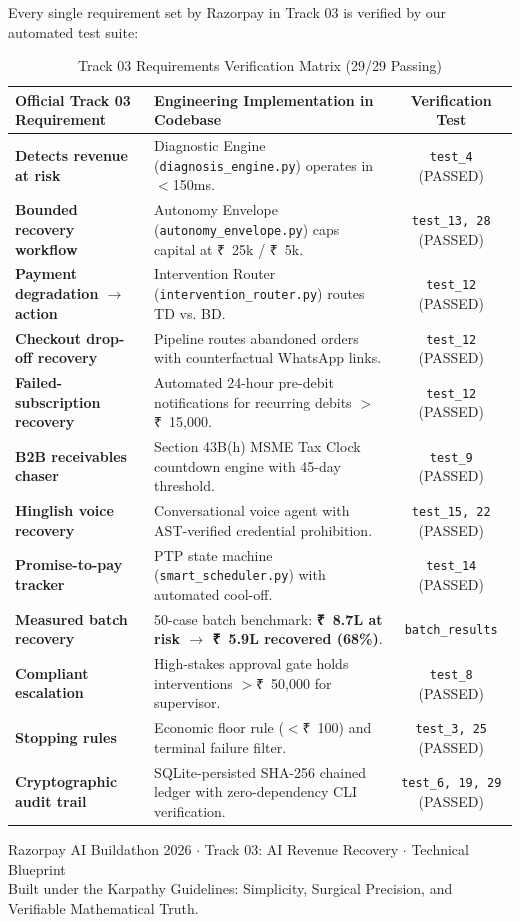 \documentclass[11pt, a4paper]{article}
\newcommand{\INR}{{\rupeefont ₹}}
\begin{document}
Every single requirement set by Razorpay in Track 03 is verified by our automated test suite:

\begin{table}[h!]
\centering
\small
\renewcommand{\arraystretch}{1.3}
\begin{tabularx}{\textwidth}{l X c}
\toprule
\textbf{Official Track 03 Requirement} & \textbf{Engineering Implementation in Codebase} & \textbf{Verification Test} \\
\midrule
\textbf{Detects revenue at risk} & Diagnostic Engine (\texttt{diagnosis\_engine.py}) operates in $<$150ms. & \texttt{test\_4} (PASSED) \\
\textbf{Bounded recovery workflow} & Autonomy Envelope (\texttt{autonomy\_envelope.py}) caps capital at \INR~25k / \INR~5k. & \texttt{test\_13, 28} (PASSED) \\
\textbf{Payment degradation $\rightarrow$ action} & Intervention Router (\texttt{intervention\_router.py}) routes TD vs. BD. & \texttt{test\_12} (PASSED) \\
\textbf{Checkout drop-off recovery} & Pipeline routes abandoned orders with counterfactual WhatsApp links. & \texttt{test\_12} (PASSED) \\
\textbf{Failed-subscription recovery} & Automated 24-hour pre-debit notifications for recurring debits $>$\INR~15,000. & \texttt{test\_12} (PASSED) \\
\textbf{B2B receivables chaser} & Section 43B(h) MSME Tax Clock countdown engine with 45-day threshold. & \texttt{test\_9} (PASSED) \\
\textbf{Hinglish voice recovery} & Conversational voice agent with AST-verified credential prohibition. & \texttt{test\_15, 22} (PASSED) \\
\textbf{Promise-to-pay tracker} & PTP state machine (\texttt{smart\_scheduler.py}) with automated cool-off. & \texttt{test\_14} (PASSED) \\
\textbf{Measured batch recovery} & 50-case batch benchmark: \textbf{\INR~8.7L at risk $\rightarrow$ \INR~5.9L recovered (68\%)}. & \texttt{batch\_results} \\
\textbf{Compliant escalation} & High-stakes approval gate holds interventions $>$\INR~50,000 for supervisor. & \texttt{test\_8} (PASSED) \\
\textbf{Stopping rules} & Economic floor rule ($<$\INR~100) and terminal failure filter. & \texttt{test\_3, 25} (PASSED) \\
\textbf{Cryptographic audit trail} & SQLite-persisted SHA-256 chained ledger with zero-dependency CLI verification. & \texttt{test\_6, 19, 29} (PASSED) \\
\bottomrule
\end{tabularx}
\caption{Track 03 Requirements Verification Matrix (29/29 Passing)}
\end{table}

\vfill
\begin{center}
  \footnotesize\color{gray}
  Razorpay AI Buildathon 2026 $\cdot$ Track 03: AI Revenue Recovery $\cdot$ Technical Blueprint\\
  Built under the Karpathy Guidelines: Simplicity, Surgical Precision, and Verifiable Mathematical Truth.
\end{center}
\end{document}
